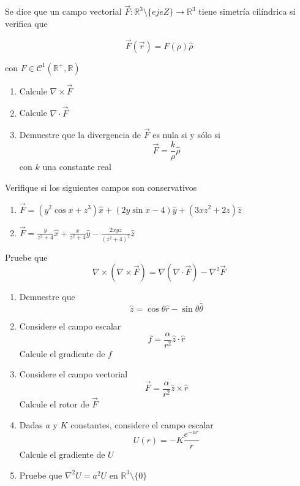 Se dice que un campo vectorial $\Vec{F}:\mathbb{R}^3\setminus\{eje Z\}\to\mathbb{R}^3$ tiene simetría cilíndrica si verifica que

\[\Vec{F}(\Vec{r}) = F(\rho)\hat{\rho}\]

con $F\in\mathcal{C}^1(\mathbb{R}^+,\mathbb{R})$

\begin{enumerate}[label=\alph*)]
    \item Calcule $\nabla\times\Vec{F}$
    \item Calcule $\nabla\cdot\Vec{F}$
    \item Demuestre que la divergencia de $\Vec{F}$ es nula si y sólo si
    \[\Vec{F}= \frac{k}{\rho}\hat{\rho}\]
    con $k$ una constante real
\end{enumerate}
\bigbreak
\np

Verifique si los siguientes campos son conservativos

\begin{enumerate}[label=\alph*)]
    \item $\Vec{F} = (y^2\cos{x}+z^3)\hat{x} + (2y\sin{x}-4)\hat{y} + (3xz^2+2z)\hat{z}$
    \item $\Vec{F} = \frac{y}{z^2+4}\hat{x} + \frac{x}{z^2+4}\hat{y} - \frac{2xyz}{(z^2+4)^2}\hat{z}$
\end{enumerate}%
\bigbreak
\np

Pruebe que 
\[\nabla\times(\nabla\times\Vec{F}) = \nabla(\nabla\cdot\Vec{F})-\nabla^2\Vec{F}\]
\bigbreak
\np

\begin{enumerate}[label=\alph*)]
    \item Demuestre que
    \[\hat{z}=\cos{\theta}\hat{r}-\sin{\theta}\hat{\theta}\]
    \item Considere el campo escalar
    \[f = \frac{\alpha}{r^2}\hat{z}\cdot\hat{r}\]
    Calcule el gradiente de $f$
    \item Considere el campo vectorial
    \[\Vec{F}=\frac{\alpha}{r^2}\hat{z}\times\hat{r}\]
    Calcule el rotor de $\Vec{F}$
    \item Dadas $a$ y $K$ constantes, considere el campo escalar
    \[U(r) = -K\frac{e^{-ar}}{r}\]
    Calcule el gradiente de $U$
    \item Pruebe que $\nabla^2 U= a^2U$ en $\mathbb{R}^3\setminus\{0\}$
\end{enumerate}
\bigbreak
\np

